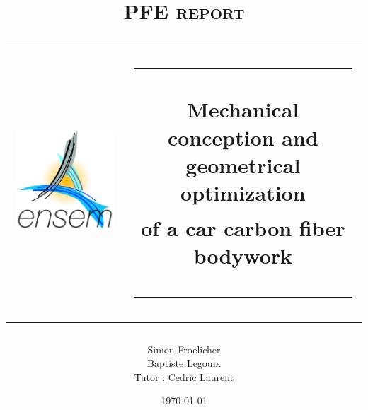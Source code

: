 \documentclass{article}
\begin{document}
\title{\textsc{PFE report} \\
\vspace{10pt}\hspace*{-30pt}\begin{tabular}{cc}
\multirow{4}{*}{
\begin{minipage}{0.25\textwidth}\vspace{15pt}\includegraphics[scale=0.53]{logoensem.png}\end{minipage}\hspace{-10pt}} & \rule{0.8\linewidth}{0.5pt}\vspace{10pt} \\ & Mechanical conception and geometrical optimization \\ &  of a car carbon fiber bodywork \\ & \rule{0.8\linewidth}{2pt}
\end{tabular}}
\author{Simon Froelicher\\ Baptiste Legouix\\ Tutor : Cedric Laurent}
\date{\today}

\clearpage
\maketitle
\thispagestyle{empty}
\end{document}
